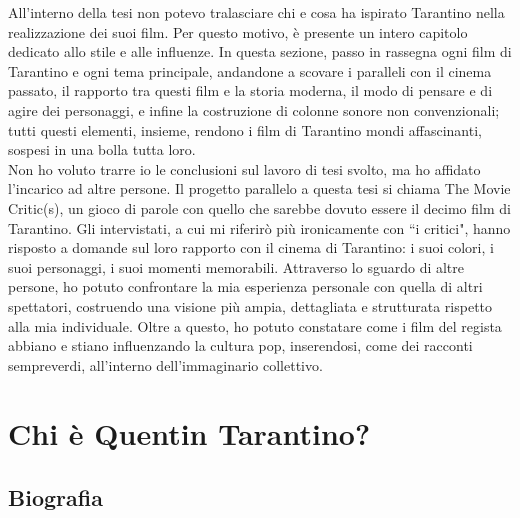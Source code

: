 \documentclass[12pt]{article} %
\begin{document}
\begin{flushleft}
    All'interno della tesi non potevo tralasciare chi e cosa ha ispirato Tarantino nella realizzazione dei suoi film. Per questo motivo, è presente un intero capitolo dedicato allo stile e alle influenze. In questa sezione, passo in rassegna ogni film di Tarantino e ogni tema principale, andandone a scovare i paralleli con il cinema passato, il rapporto tra questi film e la storia moderna, il modo di pensare e di agire dei personaggi, e infine la costruzione di colonne sonore non convenzionali; tutti questi elementi, insieme, rendono i film di Tarantino mondi affascinanti, sospesi in una bolla tutta loro.
    \\\vspace{1cm}
    Non ho voluto trarre io le conclusioni sul lavoro di tesi svolto, ma ho affidato l'incarico ad altre persone. Il progetto parallelo a questa tesi si chiama The Movie Critic(s), un gioco di parole con quello che sarebbe dovuto essere il decimo film di Tarantino.
    Gli intervistati, a cui mi riferirò più ironicamente con ``i critici", hanno risposto a domande sul loro rapporto con il cinema di Tarantino: i suoi colori, i suoi personaggi, i suoi momenti memorabili. Attraverso lo sguardo di altre persone, ho potuto confrontare la mia esperienza personale con quella di altri spettatori, 
    costruendo una visione più ampia, dettagliata e strutturata rispetto alla mia individuale. Oltre a questo, ho potuto constatare come i film del regista abbiano e stiano influenzando la cultura pop, inserendosi, come dei racconti sempreverdi, all'interno dell'immaginario collettivo.
\end{flushleft}
\break

\section{Chi è Quentin Tarantino?}
\subsection{Biografia}
\end{document}
